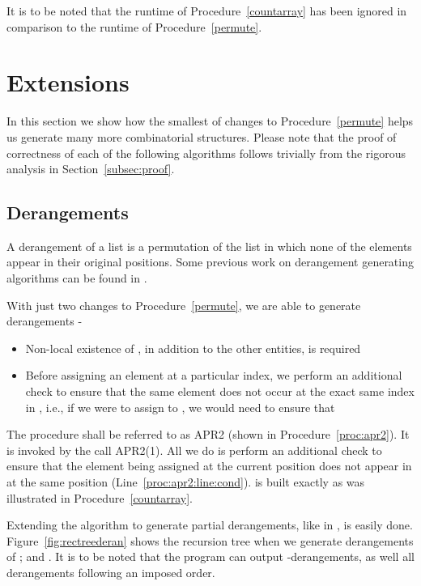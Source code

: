 \documentclass{article}
\begin{document}
It is to be noted that the runtime of Procedure~\ref{countarray} has been ignored in comparison to the runtime of Procedure~\ref{permute}.

\section{Extensions}
\label{sec:exten}

In this section we show how the smallest of changes to Procedure~\ref{permute} helps us generate many more combinatorial structures. Please note that the proof of correctness of each of the following algorithms follows trivially from the rigorous analysis in Section~\ref{subsec:proof}.

\subsection{Derangements}

A derangement of a list is a permutation of the list in which none of the elements appear in their original positions. Some previous work on derangement generating algorithms can be found in \cite{deran2, deran1}.

With just two changes to Procedure~\ref{permute}, we are able to generate derangements - 
\begin{itemize}
 \item Non-local existence of , in addition to the other entities, is required
 \item Before assigning an element at a particular index, we perform an additional check to ensure that the same element does not occur at the exact same index in , i.e., if we were to assign  to , we would need to ensure that 
\end{itemize}

The procedure shall be referred to as APR2 (shown in Procedure~\ref{proc:apr2}). It is invoked by the call APR2(1). All we do is perform an additional check to ensure that the element being assigned at the current position does not appear in  at the same position (Line~\ref{proc:apr2:line:cond}).  is built exactly as was illustrated in Procedure~\ref{countarray}.

Extending the algorithm to generate partial derangements, like in \cite{partialderan}, is easily done. Figure~\ref{fig:rectreederan} shows the recursion tree when we generate derangements of ;  and . It is to be noted that the program can output -derangements, as well all derangements following an imposed order.
\end{document}
